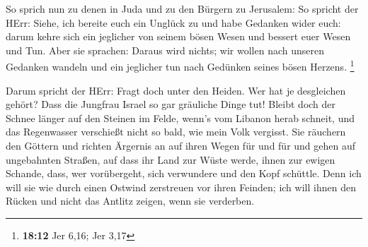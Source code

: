  So sprich nun zu denen in Juda und zu den Bürgern zu
Jerusalem: So spricht der HErr: Siehe, ich bereite euch ein Unglück zu
und habe Gedanken wider euch: darum kehre sich ein jeglicher von seinem
bösen Wesen und bessert euer Wesen und Tun.  Aber sie
sprachen: Daraus wird nichts; wir wollen nach unseren Gedanken wandeln
und ein jeglicher tun nach Gedünken seines bösen Herzens. \footnote{\textbf{18:12}
  Jer 6,16; Jer 3,17}

 Darum spricht der HErr: Fragt doch unter den Heiden. Wer
hat je desgleichen gehört? Dass die Jungfrau Israel so gar gräuliche
Dinge tut!  Bleibt doch der Schnee länger auf den Steinen
im Felde, wenn's vom Libanon herab schneit, und das Regenwasser
verschießt nicht so bald, wie mein Volk vergisst.  Sie
räuchern den Göttern und richten Ärgernis an auf ihren Wegen für und für
und gehen auf ungebahnten Straßen,  auf dass ihr Land zur
Wüste werde, ihnen zur ewigen Schande, dass, wer vorübergeht, sich
verwundere und den Kopf schüttle.  Denn ich will sie wie
durch einen Ostwind zerstreuen vor ihren Feinden; ich will ihnen den
Rücken und nicht das Antlitz zeigen, wenn sie verderben.

